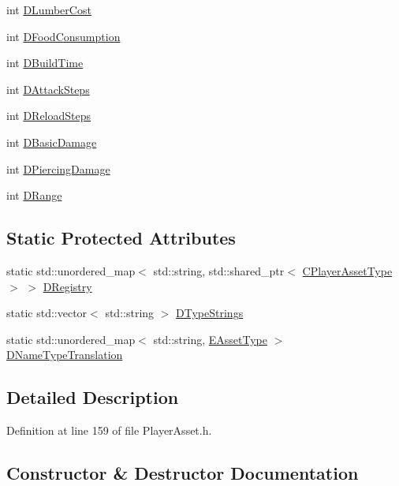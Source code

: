 \begin{DoxyCompactItemize}
int \hyperlink{classCPlayerAssetType_aab2aeb930d654fd5eab51be157b3439f}{D\+Lumber\+Cost}
\item 
int \hyperlink{classCPlayerAssetType_a8fcab35c2b576476b6f2c80c8b8762fb}{D\+Food\+Consumption}
\item 
int \hyperlink{classCPlayerAssetType_aa65de0691276352ebc3c3a9936a74278}{D\+Build\+Time}
\item 
int \hyperlink{classCPlayerAssetType_af2a95fbee4ed2ac1ff1da0f649966a6d}{D\+Attack\+Steps}
\item 
int \hyperlink{classCPlayerAssetType_a192d6ac421608663d18d1a0cda00841e}{D\+Reload\+Steps}
\item 
int \hyperlink{classCPlayerAssetType_ade46bb31e24e01ba4b523bdf67472d59}{D\+Basic\+Damage}
\item 
int \hyperlink{classCPlayerAssetType_af7303175365306fb69e5ff9170b72234}{D\+Piercing\+Damage}
\item 
int \hyperlink{classCPlayerAssetType_a1204a9470d8940fdb81a63670a0f6779}{D\+Range}
\end{DoxyCompactItemize}
\subsection*{Static Protected Attributes}
\begin{DoxyCompactItemize}
\item 
static std\+::unordered\+\_\+map$<$ std\+::string, std\+::shared\+\_\+ptr$<$ \hyperlink{classCPlayerAssetType}{C\+Player\+Asset\+Type} $>$ $>$ \hyperlink{classCPlayerAssetType_a24f4ccd06fbddacc936e31a2f1f12ed5}{D\+Registry}
\item 
static std\+::vector$<$ std\+::string $>$ \hyperlink{classCPlayerAssetType_a1f87f6f8c42b692a500c875e9359a438}{D\+Type\+Strings}
\item 
static std\+::unordered\+\_\+map$<$ std\+::string, \hyperlink{GameDataTypes_8h_a5600d4fc433b83300308921974477fec}{E\+Asset\+Type} $>$ \hyperlink{classCPlayerAssetType_a4e7728e5316eb5c1124dcac90f5290d5}{D\+Name\+Type\+Translation}
\end{DoxyCompactItemize}


\subsection{Detailed Description}


Definition at line 159 of file Player\+Asset.\+h.



\subsection{Constructor \& Destructor Documentation}
\hypertarget{classCPlayerAssetType_a2f8429c4ef261d52ea6ded8d7b4e09ee}{}\label{classCPlayerAssetType_a2f8429c4ef261d52ea6ded8d7b4e09ee} 
